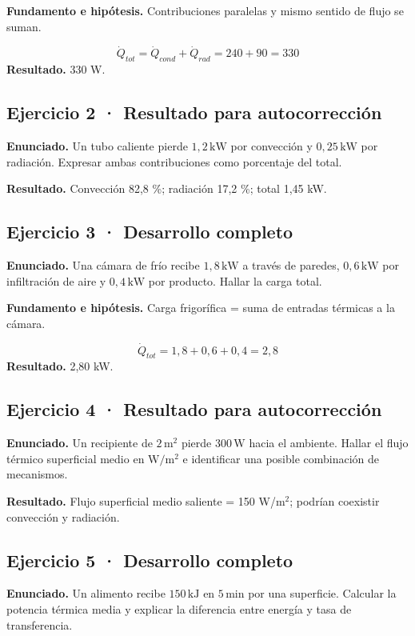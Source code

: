 \documentclass[11pt,a4paper]{article}
\begin{document}
\textbf{Fundamento e hipótesis.} Contribuciones paralelas y mismo sentido de flujo se suman.

\[
\dot Q_{tot}=\dot Q_{cond}+\dot Q_{rad}=240+90=330
\]
\textbf{Resultado.} 330 W.


\subsection*{Ejercicio 2 · Resultado para autocorrección}
\textbf{Enunciado.} Un tubo caliente pierde \(1{,}2\,\mathrm{kW}\) por convección y \(0{,}25\,\mathrm{kW}\) por radiación. Expresar ambas contribuciones como porcentaje del total.

\textbf{Resultado.} Convección 82,8 \%; radiación 17,2 \%; total 1,45 kW.


\subsection*{Ejercicio 3 · Desarrollo completo}
\textbf{Enunciado.} Una cámara de frío recibe \(1{,}8\,\mathrm{kW}\) a través de paredes, \(0{,}6\,\mathrm{kW}\) por infiltración de aire y \(0{,}4\,\mathrm{kW}\) por producto. Hallar la carga total.

\textbf{Fundamento e hipótesis.} Carga frigorífica = suma de entradas térmicas a la cámara.

\[
\dot Q_{tot}=1{,}8+0{,}6+0{,}4=2{,}8
\]
\textbf{Resultado.} 2,80 kW.


\subsection*{Ejercicio 4 · Resultado para autocorrección}
\textbf{Enunciado.} Un recipiente de \(2\,\mathrm m^2\) pierde \(300\,\mathrm W\) hacia el ambiente. Hallar el flujo térmico superficial medio en \(\mathrm{W/m^2}\) e identificar una posible combinación de mecanismos.

\textbf{Resultado.} Flujo superficial medio saliente = 150 W/m\ensuremath{^2}; podrían coexistir convección y radiación.


\subsection*{Ejercicio 5 · Desarrollo completo}
\textbf{Enunciado.} Un alimento recibe \(150\,\mathrm{kJ}\) en \(5\,\mathrm{min}\) por una superficie. Calcular la potencia térmica media y explicar la diferencia entre energía y tasa de transferencia.
\end{document}
